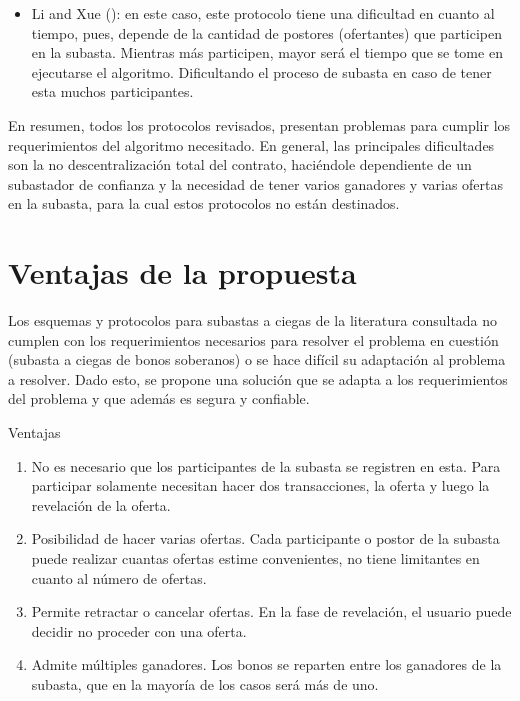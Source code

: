 \begin{itemize}
      \item Li and Xue (\citeyear{li2021}): en este caso, este protocolo tiene una dificultad en cuanto al
      tiempo, pues, depende de la cantidad de postores (ofertantes) que participen en la subasta. Mientras
      más participen, mayor será el tiempo que se tome en ejecutarse el algoritmo. Dificultando el proceso
      de subasta en caso de tener esta muchos participantes.

    \end{itemize}

    En resumen, todos los protocolos revisados, presentan problemas para cumplir los requerimientos del
    algoritmo necesitado. En general, las principales dificultades son la no descentralización total del 
    contrato, haciéndole dependiente de un subastador de confianza y la necesidad de tener varios 
    ganadores y varias ofertas en la subasta, para la cual estos protocolos no están destinados.

\section{Ventajas de la propuesta}
  Los esquemas y protocolos para subastas a ciegas de la literatura consultada no cumplen con los
   requerimientos necesarios
  para resolver el problema en cuestión (subasta a ciegas de bonos soberanos) o se hace difícil su 
  adaptación al problema a resolver.
  Dado esto, se propone una solución que se adapta a los requerimientos del problema y que además es 
  segura y confiable.

  Ventajas

  \begin{enumerate}
    \item No es necesario que los participantes de la subasta se registren en esta. Para participar solamente necesitan hacer dos 
    transacciones, la oferta y luego la revelación de la oferta.
    \item Posibilidad de hacer varias ofertas. Cada participante o postor de la subasta puede realizar cuantas ofertas estime convenientes,
    no tiene limitantes en cuanto al número de ofertas.
    \item Permite retractar o cancelar ofertas. En la fase de revelación, el usuario puede decidir no proceder con una oferta.
    \item Admite múltiples ganadores. Los bonos se reparten entre los ganadores de la subasta, que en la mayoría de los casos será más 
    de uno. 
  \end{enumerate}

